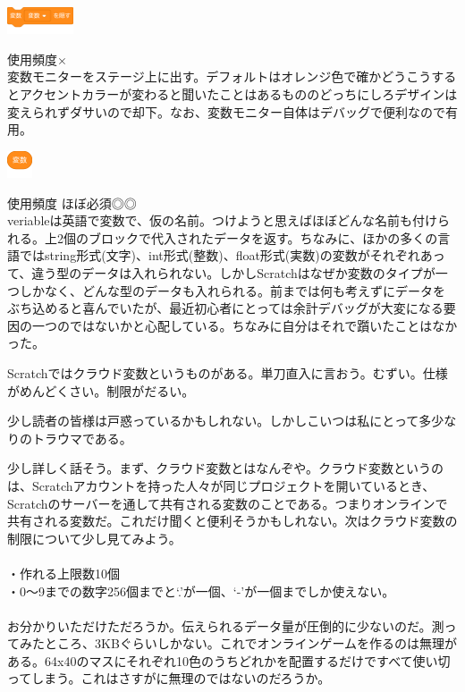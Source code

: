 \documentclass[b5paper,10pt]{jsarticle}
\begin{document}
\begin{multicols*}{3}
\begin{itembox}{3}
\includegraphics[height=8mm]{images/variables_4.png}
\end{itembox}
使用頻度×\\
変数モニターをステージ上に出す。デフォルトはオレンジ色で確かどうこうするとアクセントカラーが変わると聞いたことはあるもののどっちにしろデザインは変えられずダサいので却下。なお、変数モニター自体はデバッグで便利なので有用。
\begin{itembox}{4}
\includegraphics[height=8mm]{images/variables_5.png}
\end{itembox}
使用頻度 ほぼ必須◎◎\\
veriableは英語で変数で、仮の名前。つけようと思えばほぼどんな名前も付けられる。上2個のブロックで代入されたデータを返す。ちなみに、ほかの多くの言語ではstring形式(文字)、int形式(整数)、float形式(実数)の変数がそれぞれあって、違う型のデータは入れられない。しかしScratchはなぜか変数のタイプが一つしかなく、どんな型のデータも入れられる。前までは何も考えずにデータをぶち込めると喜んでいたが、最近初心者にとっては余計デバッグが大変になる要因の一つのではないかと心配している。ちなみに自分はそれで躓いたことはなかった。

Scratchではクラウド変数というものがある。単刀直入に言おう。むずい。仕様がめんどくさい。制限がだるい。

少し読者の皆様は戸惑っているかもしれない。しかしこいつは私にとって多少なりのトラウマである。

少し詳しく話そう。まず、クラウド変数とはなんぞや。クラウド変数というのは、Scratchアカウントを持った人々が同じプロジェクトを開いているとき、Scratchのサーバーを通して共有される変数のことである。つまりオンラインで共有される変数だ。これだけ聞くと便利そうかもしれない。次はクラウド変数の制限について少し見てみよう。\\\\
・作れる上限数10個\\
・0～9までの数字256個までと`.'が一個、`-'が一個までしか使えない。\\\\
お分かりいただけただろうか。伝えられるデータ量が圧倒的に少ないのだ。測ってみたところ、3KBぐらいしかない。これでオンラインゲームを作るのは無理がある。64x40のマスにそれぞれ10色のうちどれかを配置するだけですべて使い切ってしまう。これはさすがに無理のではないのだろうか。


\end{multicols*}
\end{document}
